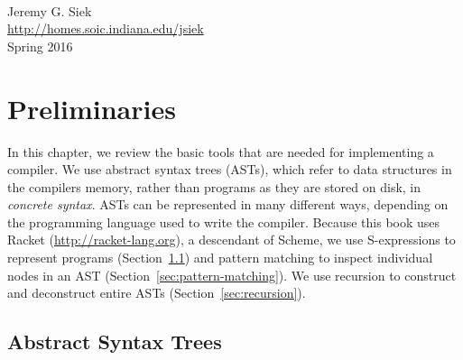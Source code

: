 \documentclass[11pt]{book}
\begin{document}
\mbox{}\\
\noindent Jeremy G. Siek \\
\noindent \url{http://homes.soic.indiana.edu/jsiek} \\
\noindent Spring 2016

\fi{} %

\chapter{Preliminaries}
\label{ch:trees-recur}

In this chapter, we review the basic tools that are needed for implementing a
compiler. We use abstract syntax trees (ASTs), which refer to data structures in
the compilers memory, rather than programs as they are stored on disk, in
\emph{concrete syntax}.
%
ASTs can be represented in many different ways, depending on the programming
language used to write the compiler.
%
Because this book uses Racket (\url{http://racket-lang.org}), a descendant of
Scheme, we use S-expressions to represent programs (Section~\ref{sec:ast})
and pattern matching to inspect individual nodes in an AST
(Section~\ref{sec:pattern-matching}).  We use recursion to construct
and deconstruct entire ASTs (Section~\ref{sec:recursion}).

\section{Abstract Syntax Trees}
\label{sec:ast}
\end{document}
